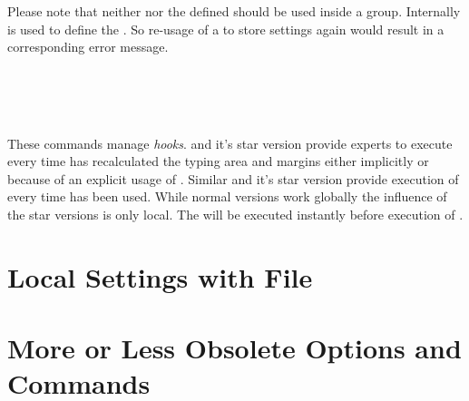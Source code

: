 Please note that neither  nor the
defined  should be used inside a group. Internally
 is
used to define the . So re-usage of a
 to store settings again would result in a
corresponding error message.
%

\begin{Declaration}
  \\
  \\
  \\
\end{Declaration}%
%
These commands manage \emph{hooks}.  and it's
star version provide experts to execute  every time
 has recalculated the typing area and margins either
implicitly or because of an explicit usage of . Similar
 and it's star
version provide execution of  every time 
has been used. While normal versions work globally the influence of the star
versions is only local. The  will be executed instantly
before execution of .%
% 


\section{Local Settings with File }



\section{More or Less Obsolete Options and Commands}


\endinput

